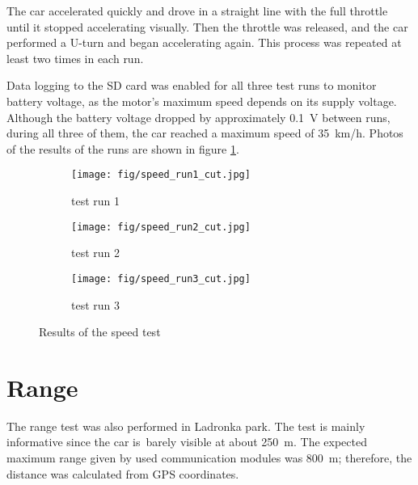 The car accelerated quickly and drove in a straight line with the full throttle until it stopped accelerating visually. Then the throttle was released, and the car performed a U-turn and began accelerating again. This process was repeated at least two times in each run.

Data logging to the SD card was enabled for all three test runs to monitor battery voltage, as the motor's maximum speed depends on its supply voltage.
Although the battery voltage dropped by approximately \SI{0.1}{\V} between runs, during all three of them, the car reached a maximum speed of \SI{35}{km/h}. Photos of the results of the runs are shown in figure \ref{fig:speed}.
\begin{figure}[h]
    \centering
    \begin{subfigure}{0.32\textwidth}
    \centering
        \texttt{[image: fig/speed\_run1\_cut.jpg]}
		\caption{test run 1}
    \end{subfigure}%
    \hspace{0.1cm}
    \begin{subfigure}{0.32\textwidth}
    \centering
		\texttt{[image: fig/speed\_run2\_cut.jpg]}
		\caption{test run 2}
    \end{subfigure}
    \hspace{0.1cm}
    \begin{subfigure}{0.32\textwidth}
    \centering
		\texttt{[image: fig/speed\_run3\_cut.jpg]}
		\caption{test run 3}
    \end{subfigure}
	\caption{Results of the speed test}
    \label{fig:speed}
\end{figure}

\section{Range}
The range test was also performed in Ladronka park. The test is mainly informative since the car is~barely visible at about \SI{250}{\m}. The expected maximum range given by used communication modules was \SI{800}{\m}; therefore, the distance was calculated from GPS coordinates.

